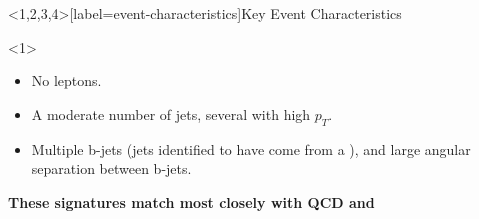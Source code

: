 \documentclass[]{beamer}
\begin{document}
\begin{frame}<1,2,3,4>[label=event-characteristics]{Key Event Characteristics}
  \begin{onlyenv}<1>
    \begin{itemize}
    \item No leptons.
    \item A moderate number of jets, several with high $p_{T}$.
    \item Multiple b-jets (jets identified to have come from a \quarkb), and large angular separation between b-jets. 
    \end{itemize}
    {\bfseries     These signatures match most closely with QCD and \quarkt\aquarkt{}}
    \begin{center}
    \end{center}
  \end{onlyenv}


\end{frame}
\end{document}
